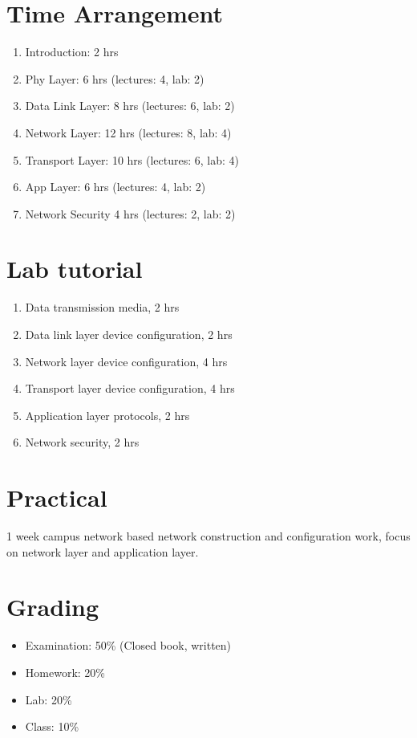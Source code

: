 \documentclass{wx672article}
\begin{document}
\section*{Time Arrangement}
\label{sec-3}

\begin{enumerate}
\item Introduction: 2 hrs
\item Phy Layer: 6 hrs (lectures: 4, lab: 2)
\item Data Link Layer: 8 hrs (lectures: 6, lab: 2)
\item Network Layer: 12 hrs (lectures: 8, lab: 4)
\item Transport Layer: 10 hrs (lectures: 6, lab: 4)
\item App Layer: 6 hrs (lectures: 4, lab: 2)
\item Network Security 4 hrs (lectures: 2, lab: 2)
\end{enumerate}
\section*{Lab tutorial}
\label{sec-4}

\begin{enumerate}
\item Data transmission media, 2 hrs
\item Data link layer device configuration, 2 hrs
\item Network layer device configuration, 4 hrs
\item Transport layer device configuration, 4 hrs
\item Application layer protocols, 2 hrs
\item Network security, 2 hrs
\end{enumerate}
\section*{Practical}
\label{sec-5}

   1 week campus network based network construction and configuration work, focus on
   network layer and application layer.
\section*{Grading}
\label{sec-6}

\begin{itemize}
\item Examination: 50\% (Closed book, written)
\item Homework: 20\%
\item Lab: 20\%
\item Class: 10\%
\end{itemize}
\end{document}
